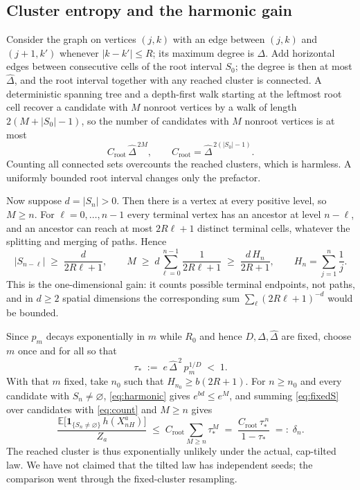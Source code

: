 \documentclass[11pt]{article}
\theoremstyle{plain}
\theoremstyle{definition}
\theoremstyle{remark}
\newcommand{\E}{\mathbb{E}}
\newcommand{\hatD}{\widehat{\Delta}}
\begin{document}
\subsection{Cluster entropy and the harmonic gain}
\label{sec:entropy}

Consider the graph on vertices $(j,k)$ with an edge between $(j,k)$ and $(j+1,k')$ whenever $|k-k'|\le R$; its maximum degree is $\Delta$. Add horizontal edges between consecutive cells of the root interval $S_0$; the degree is then at most $\hatD$, and the root interval together with any reached cluster is connected. A deterministic spanning tree and a depth-first walk starting at the leftmost root cell recover a candidate with $M$ nonroot vertices by a walk of length $2(M+|S_0|-1)$, so the number of candidates with $M$ nonroot vertices is at most
\begin{equation}
C_{\mathrm{root}}\,\hatD^{\,2M},\qquad C_{\mathrm{root}}=\hatD^{\,2(|S_0|-1)}.
\label{eq:count}
\end{equation}
Counting all connected sets overcounts the reached clusters, which is harmless. A uniformly bounded root interval changes only the prefactor.

Now suppose $d=|S_n|>0$. Then there is a vertex at every positive level, so $M\ge n$. For $\ell=0,\dots,n-1$ every terminal vertex has an ancestor at level $n-\ell$, and an ancestor can reach at most $2R\ell+1$ distinct terminal cells, whatever the splitting and merging of paths. Hence
\begin{equation}
|S_{n-\ell}|\;\ge\;\frac{d}{2R\ell+1},\qquad M\;\ge\;d\sum_{\ell=0}^{n-1}\frac1{2R\ell+1}\;\ge\;\frac{d\,H_n}{2R+1},\qquad H_n=\sum_{j=1}^n\frac1j.
\label{eq:harmonic}
\end{equation}
This is the one-dimensional gain: it counts possible terminal endpoints, not paths, and in $d\ge2$ spatial dimensions the corresponding sum $\sum_\ell(2R\ell+1)^{-d}$ would be bounded.

Since $p_m$ decays exponentially in $m$ while $R_0$ and hence $D,\Delta,\hatD$ are fixed, choose $m$ once and for all so that
\begin{equation}
\tau_*\;:=\;e\,\hatD^{\,2}\,p_m^{1/D}\;<\;1.
\label{eq:taustar}
\end{equation}
With that $m$ fixed, take $n_0$ such that $H_{n_0}\ge b(2R+1)$. For $n\ge n_0$ and every candidate with $S_n\neq\varnothing$, \eqref{eq:harmonic} gives $e^{bd}\le e^M$, and summing \eqref{eq:fixedS} over candidates with \eqref{eq:count} and $M\ge n$ gives
\begin{equation}
\frac{\E\bigl[\mathbf 1_{\{S_n\neq\varnothing\}}\,h(X^a_{nH})\bigr]}{Z_a}\;\le\;C_{\mathrm{root}}\sum_{M\ge n}\tau_*^M\;=\;\frac{C_{\mathrm{root}}\,\tau_*^{\,n}}{1-\tau_*}\;=:\;\delta_n.
\label{eq:capbound}
\end{equation}
The reached cluster is thus exponentially unlikely under the actual, cap-tilted law. We have not claimed that the tilted law has independent seeds; the comparison went through the fixed-cluster resampling.
\end{document}
